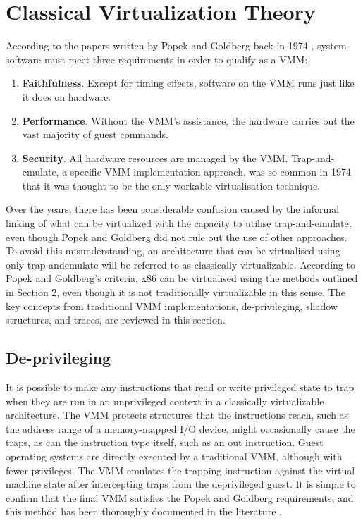 \section{Classical Virtualization Theory}
According to the papers written by Popek and Goldberg
back in 1974 \cite{citation_17}, system software must meet three
requirements in order to qualify as a VMM:
\begin{enumerate}
    \item \textbf{Faithfulness}. Except for timing effects, software
    on the VMM runs just like it does on hardware.
    \item \textbf{Performance}. Without the VMM's assistance,
    the hardware carries out the vast majority of
    guest commands.
    \item \textbf{Security}. All hardware resources are managed
    by the VMM. Trap-and-emulate, a specific
    VMM implementation approach, was so
    common in 1974 that it was thought to be the
    only workable virtualisation technique.
  \end{enumerate}
Over the years, there has been considerable confusion
caused by the informal linking of what can be virtualized
with the capacity to utilise trap-and-emulate, even though
Popek and Goldberg did not rule out the use of other
approaches. To avoid this misunderstanding, an
architecture that can be virtualised using only trap-andemulate will be referred to as classically virtualizable.
According to Popek and Goldberg's criteria, x86 can be
virtualised using the methods outlined in Section 2, even
though it is not traditionally virtualizable in this sense.
The key concepts from traditional VMM
implementations, de-privileging, shadow structures, and
traces, are reviewed in this section. 
\subsection{De-privileging}
It is possible to make any instructions that read or write
privileged state to trap when they are run in an
unprivileged context in a classically virtualizable
architecture. The VMM protects structures that the
instructions reach, such as the address range of a
memory-mapped I/O device, might occasionally cause the
traps, as can the instruction type itself, such as an out
instruction. Guest operating systems are directly executed
by a traditional VMM, although with fewer privileges.
The VMM emulates the trapping instruction against the
virtual machine state after intercepting traps from the deprivileged guest. It is simple to confirm that the final
VMM satisfies the Popek and Goldberg requirements,
and this method has been thoroughly documented in the
literature \cite{citation_10}\cite{citation_18}\cite{citation_19_book}. 
